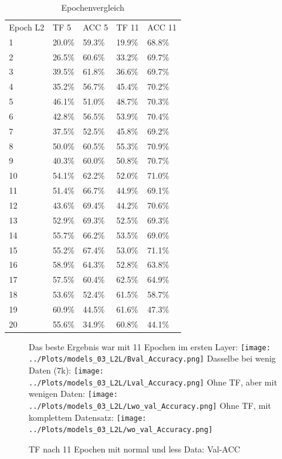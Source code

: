     \begin{table}[h!]
        \begin{center}
            \caption{Epochenvergleich}
            \label{tab4:Table}
            \begin{tabular}{l|l|l|l|l}
                Epoch L2 & TF 5 & ACC 5 & TF 11 & ACC 11 \\
                1 & 20.0\% & 59.3\% & 19.9\% & 68.8\% \\
                2 & 26.5\% & 60.6\% & 33.2\% & 69.7\% \\
                3 & 39.5\% & 61.8\% & 36.6\% & 69.7\% \\
                4 & 35.2\% & 56.7\% & 45.4\% & 70.2\% \\
                5 & 46.1\% & 51.0\% & 48.7\% & 70.3\% \\
                6 & 42.8\% & 56.5\% & 53.9\% & 70.4\% \\
                7 & 37.5\% & 52.5\% & 45.8\% & 69.2\% \\
                8 & 50.0\% & 60.5\% & 55.3\% & 70.9\% \\
                9 & 40.3\% & 60.0\% & 50.8\% & 70.7\% \\
                10 & 54.1\% & 62.2\% & 52.0\% & 71.0\% \\
                11 & 51.4\% & 66.7\% & 44.9\% & 69.1\% \\
                12 & 43.6\% & 69.4\% & 44.2\% & 70.6\% \\
                13 & 52.9\% & 69.3\% & 52.5\% & 69.3\% \\
                14 & 55.7\% & 66.2\% & 53.5\% & 69.0\% \\
                15 & 55.2\% & 67.4\% & 53.0\% & 71.1\% \\
                16 & 58.9\% & 64.3\% & 52.8\% & 63.8\% \\
                17 & 57.5\% & 60.4\% & 62.5\% & 64.9\% \\
                18 & 53.6\% & 52.4\% & 61.5\% & 58.7\% \\
                19 & 60.9\% & 44.5\% & 61.6\% & 47.3\% \\
                20 & 55.6\% & 34.9\% & 60.8\% & 44.1\% \\
            \end{tabular}
        \end{center}
    \end{table}

    \begin{figure}[htpb]
        Das beste Ergebnis war mit 11 Epochen im ersten Layer:
        \texttt{[image: ../Plots/models\_03\_L2L/Bval\_Accuracy.png]}
        Dasselbe bei wenig Daten (7k): 
        \texttt{[image: ../Plots/models\_03\_L2L/Lval\_Accuracy.png]}
        Ohne TF, aber mit wenigen Daten:
        \texttt{[image: ../Plots/models\_03\_L2L/Lwo\_val\_Accuracy.png]}
        Ohne TF, mit komplettem Datensatz: 
        \texttt{[image: ../Plots/models\_03\_L2L/wo\_val\_Accuracy.png]}
        \caption{\label{fig:figure4} TF nach 11 Epochen mit normal und less Data: Val-ACC}
    \end{figure}


